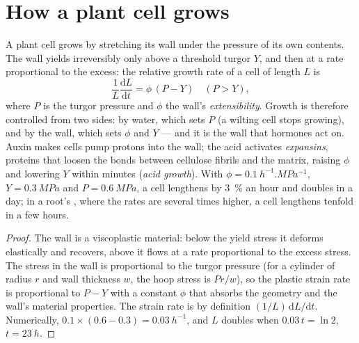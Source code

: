 \section{How a plant cell grows}

\begin{theorem}\label{thm:b2:plant-meristems:lockhart}
A plant cell grows by stretching its wall under the pressure of its
own contents. The wall yields irreversibly only above a threshold
turgor $Y$, and then at a rate proportional to the excess: the
relative growth rate of a cell of length $L$ is
\[
\frac{1}{L}\frac{\mathrm{d}L}{\mathrm{d}t} = \phi\,(P - Y) \quad (P > Y),
\]
where $P$ is the turgor pressure and $\phi$ the wall's
\emph{extensibility}. Growth is therefore controlled from two sides:
by water, which sets $P$ (a wilting cell stops growing), and by the
wall, which sets $\phi$ and $Y$ --- and it is the wall that hormones
act on. Auxin makes cells pump protons into the wall; the acid
activates \emph{expansins}, proteins that loosen the bonds between
cellulose fibrils and the matrix, raising $\phi$ and lowering $Y$
within minutes (\emph{acid growth}). With $\phi =
\qty{0.1}{h^{-1}.MPa^{-1}}$, $Y = \qty{0.3}{MPa}$ and $P =
\qty{0.6}{MPa}$, a cell lengthens by \qty{3}{\%} an hour and doubles
in a day; in a root's , where the rates are several
times higher, a cell lengthens tenfold in a few hours.
\end{theorem}
\begin{proof}
The wall is a viscoplastic material: below the yield stress it
deforms elastically and recovers, above it flows at a rate
proportional to the excess stress. The stress in the wall is
proportional to the turgor pressure (for a cylinder of radius $r$
and wall thickness $w$, the hoop stress is $Pr/w$), so the plastic
strain rate is proportional to $P - Y$ with a constant $\phi$ that
absorbs the geometry and the wall's material properties. The strain
rate is by definition $(1/L)\,\mathrm{d}L/\mathrm{d}t$. Numerically,
$0.1\times(0.6 - 0.3) = \qty{0.03}{h^{-1}}$, and $L$ doubles when
$0.03\,t = \ln 2$, $t = \qty{23}{h}$.
\end{proof}

